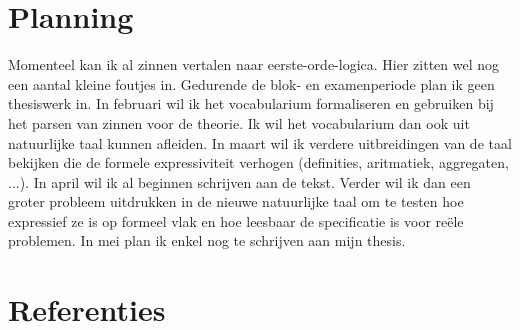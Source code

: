 \documentclass[]{article}
\theoremstyle{definition}
\begin{document}

\section{Planning}
Momenteel kan ik al zinnen vertalen naar eerste-orde-logica. Hier zitten wel nog een aantal kleine foutjes in.
Gedurende de blok- en examenperiode plan ik geen thesiswerk in. In februari wil ik het vocabularium formaliseren en gebruiken bij het parsen van zinnen voor de theorie. Ik wil het vocabularium dan ook uit natuurlijke taal kunnen afleiden. In maart wil ik verdere uitbreidingen van de taal bekijken die de formele expressiviteit verhogen (definities, aritmatiek, aggregaten, ...). In april wil ik al beginnen schrijven aan de tekst. Verder wil ik dan een groter probleem uitdrukken in de nieuwe natuurlijke taal om te testen hoe expressief ze is op formeel vlak en hoe leesbaar de specificatie is voor reële problemen. In mei plan ik enkel nog te schrijven aan mijn thesis.

\pagebreak
\section{Referenties}


\end{document}
